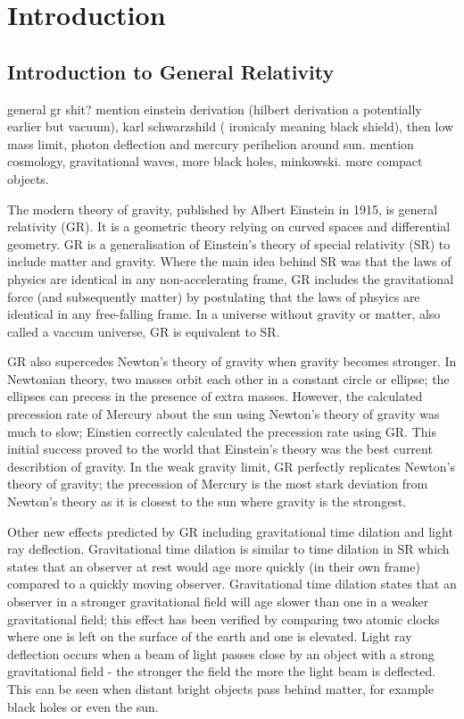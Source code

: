

\section{Introduction}
\subsection{Introduction to General Relativity}
general gr shit?
mention einstein derivation (hilbert derivation a potentially earlier but vacuum), karl schwarzshild ( ironicaly meaning black shield), then low mass limit, photon deflection and mercury perihelion around sun. mention cosmology, gravitational waves, more black holes, minkowski. more compact objects. 

The modern theory of gravity, published by Albert Einstein in 1915, is general relativity (GR). It is a geometric theory relying on curved spaces and differential geometry. GR is a generalisation of Einstein's theory of special relativity (SR) to include matter and gravity. Where the main idea behind SR was that the laws of physics are identical in any non-accelerating frame, GR includes the gravitational force (and subsequently matter) by postulating that the laws of phsyics are identical in any free-falling frame. In a universe without gravity or matter, also called a vaccum universe, GR is equivalent to SR.

GR also supercedes Newton's theory of gravity when gravity becomes stronger. In Newtonian theory, two masses orbit each other in a constant circle or ellipse; the ellipses can precess in the presence of extra masses. However, the calculated precession rate of Mercury about the sun using Newton's theory of gravity was much to slow; Einstien correctly calculated the precession rate using GR. This initial success proved to the world that Einstein's theory was the best current describtion of gravity. In the weak gravity limit, GR perfectly replicates Newton's theory of gravity; the precession of Mercury is the most stark deviation from Newton's theory as it is closest to the sun where gravity is the strongest. 

Other new effects predicted by GR including gravitational time dilation and light ray deflection. Gravitational time dilation is similar to time dilation in SR which states that an observer at rest would age more quickly (in their own frame) compared to a quickly moving observer. Gravitational time dilation states that an observer in a stronger gravitational field will age slower than one in a weaker gravitational field; this effect has been verified by comparing two atomic clocks where one is left on the surface of the earth and one is elevated. Light ray deflection occurs when a beam of light passes close by an object with a strong gravitational field - the stronger the field the more the light beam is deflected. This can be seen when distant bright objects pass behind matter, for example black holes or even the sun.

